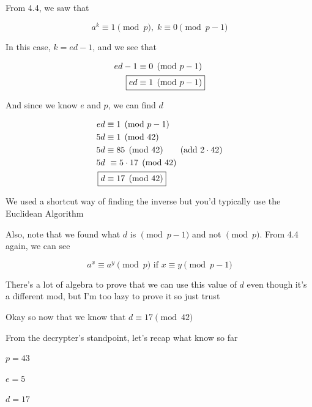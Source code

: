 \documentclass[../../Main.tex]{subfiles}
\begin{document}
\begin{definition}
\begin{example}
        \begin{recall}
            From 4.4, we saw that

            $$a^k \equiv 1 \pmod{p}, \; k \equiv 0 \pmod{p - 1}$$
        \end{recall}

        In this case, $k = ed - 1$, and we see that

        \begin{align*}
            ed - 1 &\equiv 0 \pmod{p - 1} \\
            \Aboxed{ed &\equiv 1 \pmod{p - 1}}
        \end{align*}

        And since we know $e$ and $p$, we can find $d$

        \begin{align*}
            ed &\equiv 1 \pmod{p - 1} \\
            5d &\equiv 1 \pmod{42} \\
            5d &\equiv 85 \pmod{42} \tag{add $2 \cdot 42$} \\
            5d &\ \equiv 5 \cdot 17 \pmod{42} \\
            \Aboxed{d &\equiv 17 \pmod{42}} \\
        \end{align*}

        \begin{note}
            We used a shortcut way of finding the inverse but you'd typically use the Euclidean Algorithm
        \end{note}

        \begin{recall}
            Also, note that we found what $d$ is $\pmod{p - 1}$ and not $\pmod{p}$. From 4.4 again, we can see

            $$a^x \equiv a^y \pmod{p} \text{ if } x \equiv y \pmod{p - 1}$$

            There's a lot of algebra to prove that we can use this value of $d$ even though it's a different mod, but I'm too lazy to prove it so just trust
        \end{recall}

        Okay so now that we know that $d \equiv 17 \pmod{42}$

        From the decrypter's standpoint, let's recap what know so far

        $p = 43$
        
        $e = 5$

        $d = 17$


\end{example}
\end{definition}
\end{document}
